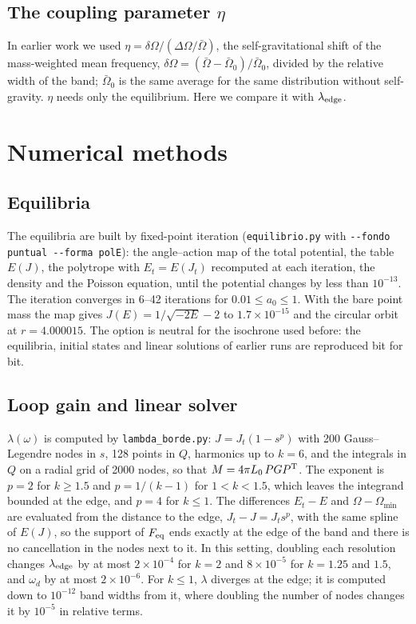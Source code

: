 \documentclass[11pt,a4paper]{article}
\begin{document}
\subsection{The coupling parameter \texorpdfstring{$\eta$}{eta}}

In earlier work we used $\eta=\delta\Omega/(\Delta\Omega/\bar\Omega)$, the self-gravitational shift
of the mass-weighted mean frequency, $\delta\Omega=(\bar\Omega-\bar\Omega_0)/\bar\Omega_0$, divided by the
relative width of the band; $\bar\Omega_0$ is the same average for the same distribution
without self-gravity. $\eta$ needs only the equilibrium. Here we compare it with
$\lambda_{\rm edge}$.

\section{Numerical methods}
\label{sec:metodos}

\subsection{Equilibria}

The equilibria are built by fixed-point iteration (\texttt{equilibrio.py} with
\texttt{-{}-fondo puntual -{}-forma polE}): the angle--action map of the total potential,
the table $E(J)$, the polytrope with $E_t=E(J_t)$ recomputed at each iteration, the density
and the Poisson equation, until the potential changes by less than $10^{-13}$. The
iteration converges in 6--42 iterations for $0.01\le a_0\le1$. With the bare point mass the
map gives $J(E)=1/\sqrt{-2E}-2$ to $1.7\times10^{-15}$ and the circular orbit at
$r=4.000015$. The option is neutral for the isochrone used before: the equilibria,
initial states and linear solutions of earlier runs are reproduced bit for bit.

\subsection{Loop gain and linear solver}

$\lambda(\omega)$ is computed by \texttt{lambda\_borde.py}: $J=J_t(1-s^p)$ with 200
Gauss--Legendre nodes in $s$, 128 points in $Q$, harmonics up to $k=6$, and the integrals
in $Q$ on a radial grid of 2000 nodes, so that $M=4\pi L_0\,PGP^{\rm T}$. The exponent is $p=2$
for $k\ge1.5$ and $p=1/(k-1)$ for $1<k<1.5$, which leaves the integrand bounded at the edge,
and $p=4$ for $k\le1$. The differences $E_t-E$ and $\Omega-\Omega_{\min}$ are evaluated from the
distance to the edge, $J_t-J=J_ts^p$, with the same spline of $E(J)$, so the support of
$F_{\rm eq}$ ends exactly at the edge of the band and there is no cancellation in the nodes
next to it. In this setting, doubling each resolution changes $\lambda_{\rm edge}$ by at most
$2\times10^{-4}$ for $k=2$ and $8\times10^{-5}$ for $k=1.25$ and $1.5$, and $\omega_d$ by at most
$2\times10^{-6}$. For $k\le1$, $\lambda$ diverges at the edge; it is computed down to $10^{-12}$
band widths from it, where doubling the number of nodes changes it by $10^{-5}$ in relative
terms.
\end{document}
